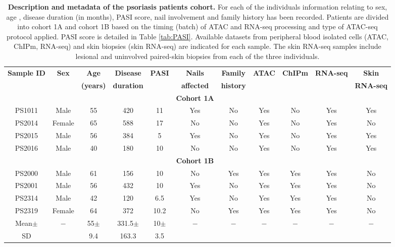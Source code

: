 \begin{landscape}
\begin{center}
\begin{longtable}[ht]{c c c c c c c c c c c}
\caption[Description and metadata of the psoriasis patients cohort.]{\textbf{Description and metadata of the psoriasis patients cohort.} For each of the individuals information relating to sex, age , disease duration (in months), PASI score, nail involvement and family history has been recorded. Patients are divided into cohort 1A and cohort 1B based on the timing (batch) of ATAC and RNA-seq processing and type of ATAC-seq protocol applied. PASI score is detailed in Table \ref{tab:PASI}. Available datasets from peripheral blood isolated cells (ATAC, ChIPm, RNA-seq) and skin biopsies (skin RNA-seq) are indicated for each sample. The skin RNA-seq samples include lesional and uninvolved paired-skin biopsies from each of the three individuals.}
\label{tab:Psoriasis_cohort_metadata} \\
\toprule
\textbf{Sample ID} & \textbf{Sex} & \textbf{Age}    & \textbf{Disease}  & \textbf{PASI}  &\textbf{Nails}      & \textbf{Family}  & \textbf{ATAC} & \textbf{ChIPm}& \textbf{RNA-seq} & \textbf{Skin}\\
                    &              & \textbf{(years)} & \textbf{duration} &                & \textbf{affected}  & \textbf{history} & & & & \textbf{RNA-seq} \\
\midrule
\midrule
& & & & & \textbf{Cohort 1A} & & & & & \\
\midrule
PS1011	& Male	 & 55 & 420 & 11	 & Yes	 & No & Yes& No& Yes& Yes\\
PS2014	& Female & 65	& 588	& 17	 & No	   & No & Yes& No& Yes& No\\
PS2015	& Male	 & 56	& 384	& 5	   & Yes   & No & Yes& No& Yes& Yes\\
PS2016	& Male	 & 40	& 180	& 10	 & No    & No & Yes& No& Yes& Yes\\
\midrule
\midrule
 & & & & &\textbf{Cohort 1B} & & & & & \\
\midrule
PS2000	& Male	 & 61	& 156	& 10	 & No	   & Yes & Yes& Yes& Yes& No\\
PS2001	& Male	 & 56	& 432	& 10	 & Yes	 & No  & Yes& Yes& Yes& No\\
PS2314	& Male	 & 42	& 120	& 6.5	 & Yes   & No  & Yes& Yes& Yes& No\\
PS2319	& Female & 64	& 372	& 10.2 & No    & Yes & Yes& Yes& Yes& No\\
\midrule
Mean$\pm$		& $-$	 & 55$\pm$ & 331.5$\pm$ & 10$\pm$ & $-$   & $-$ & $-$ & $-$ & $-$ & $-$ \\
SD      		&      & 9.4     & 163.3      & 3.5     &       &     &     &     &     &  \\																			
\bottomrule
\end{longtable}
\end{center}
\end{landscape}

